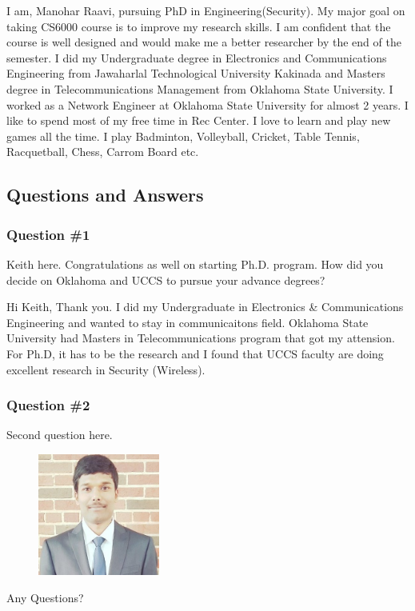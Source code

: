 
I am, Manohar Raavi, pursuing PhD in Engineering(Security). My major goal on taking CS6000 course is to improve my research skills. 
I am confident that the course is well designed and would make me a better researcher by the end of the semester.
 I did my Undergraduate degree in Electronics and Communications Engineering from Jawaharlal Technological University Kakinada and Masters degree in Telecommunications Management from Oklahoma State University. I worked as a Network Engineer at Oklahoma State University for almost 2 years. I like to spend most of my free time in Rec Center.
 I love to learn and play new games all the time. I play Badminton, Volleyball, Cricket, Table Tennis, Racquetball, Chess, Carrom Board etc.

\subsection{Questions and Answers}
\subsubsection {Question \#1}
Keith here. Congratulations as well on starting Ph.D. program. How did you decide on Oklahoma and UCCS to pursue your advance degrees?

Hi Keith,
Thank you. I did my Undergraduate in Electronics & Communications Engineering and wanted to stay in communicaitons field.
Oklahoma State University had Masters in Telecommunications program that got my attension. For Ph.D, it has to be the research and I found that UCCS faculty are doing excellent research in Security (Wireless).



\subsubsection {Question \#2}

Second question here.

\begin{figure}[htp]
    \centering
    \includegraphics[width=4cm]{linkd1}
\end{figure}

Any Questions?